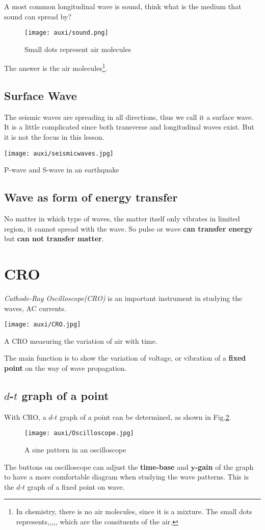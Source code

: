 \documentclass[a4paper]{tufte-handout}
\begin{document}
A most common longitudinal wave is sound, think what is the medium that sound can spread by?
\begin{figure}[h]
\centering
\texttt{[image: auxi/sound.png]}
\caption{Small dots represent air molecules}
\label{fig:sound wave}
\end{figure}
The answer is the air molecules\footnote{In chemistry, there is no air molecules, since it is a mixture. The small dots represents,,,,, which are the consituents of the air.}.

\subsection*{Surface Wave}
The seismic waves are spreading in all directions, thus we call it a surface wave. It is a little complicated since both transverse and longitudinal waves exist. But it is not the focus in this lesson. 
\begin{marginfigure}
\texttt{[image: auxi/seismicwaves.jpg]}
\caption{P-wave and S-wave in an earthquake}
\end{marginfigure}


\subsection{Wave as form of energy transfer}
No matter in which type of waves, the matter itself only vibrates in limited region, it cannot spread with the wave. So pulse or wave \textbf{can transfer energy} but \textbf{can not transfer matter}.

\section{CRO}
\emph{Cathode-Ray Oscilloscope(CRO)} is an important instrument in studying the waves, AC currents.

\begin{marginfigure}
\texttt{[image: auxi/CRO.jpg]}
\caption{A CRO measuring the variation of air with time.}
\end{marginfigure}

The main function is to show the variation of voltage, or vibration of a \textbf{fixed point} on the way of wave propagation.

\subsection{$d$-$t$ graph of a point}
With CRO, a $d$-$t$ graph of a point can be determined, as shown in Fig.\ref{fig:result on oscilloscope}. 
\begin{figure}
\centering
\texttt{[image: auxi/Oscilloscope.jpg]}
\caption{A sine pattern in an oscilloscope}
\label{fig:result on oscilloscope}
\end{figure}
The buttons on oscilloscope can adjust the \textbf{time-base} and \textbf{$\mathbf{y}$-gain} of the graph to have a more comfortable diagram when studying the wave patterns. This is the $d$-$t$ graph of a fixed point on wave.
\end{document}
